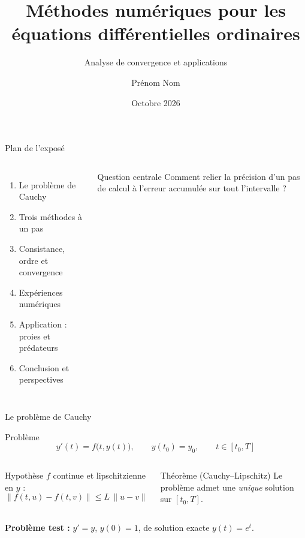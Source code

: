 \documentclass[aspectratio=169,11pt]{beamer}
\title{Méthodes numériques pour les équations différentielles ordinaires}
\subtitle{Analyse de convergence et applications}
\author{Prénom Nom}
\date{Octobre 2026}
\newcommand{\norm}[1]{\lVert #1\rVert}
\begin{document}
\begin{frame}[plain,t]
  \titlepage
\end{frame}

\begin{frame}{Plan de l'exposé}
  \begin{columns}[T]
    \begin{enumerate}
      \setlength{\itemsep}{0.7em}
      \item Le problème de Cauchy
      \item Trois méthodes à un pas
      \item Consistance, ordre et convergence
      \item Expériences numériques
      \item Application : proies et prédateurs
      \item Conclusion et perspectives
    \end{enumerate}
    \begin{block}{Question centrale}
      Comment relier la précision d'un pas de calcul à l'erreur accumulée sur tout l'intervalle ?
    \end{block}
  \end{columns}
\end{frame}

\begin{frame}{Le problème de Cauchy}
  \begin{block}{Problème}
    \[
      y'(t)=f\bigl(t,y(t)\bigr),\qquad y(t_0)=y_0,\qquad t\in[t_0,T]
    \]
  \end{block}
  \vspace{0.4em}
  \begin{columns}[T]
    \begin{block}{Hypothèse}
      $f$ continue et lipschitzienne en $y$ :
      \[
        \norm{f(t,u)-f(t,v)}\le L\,\norm{u-v}
      \]
    \end{block}
    \begin{block}{Théorème (Cauchy--Lipschitz)}
      Le problème admet une \emph{unique} solution sur $[t_0,T]$.
    \end{block}
  \end{columns}
  \vspace{0.5em}
  \textbf{Problème test :} $y'=y$, $y(0)=1$, de solution exacte $y(t)=e^{t}$.
\end{frame}
\end{document}
